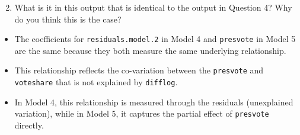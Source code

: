 \documentclass[12pt,letterpaper]{article}
\begin{document}
\noindent\begin{enumerate}[left=0pt]
\setcounter{enumi}{1}	
\item What is it in this output that is identical to the output in Question 4? Why do you think this is the case?
\end{enumerate}
\begin{itemize}
	\item The coefficients for \texttt{residuals.model.2} in Model 4 and \texttt{presvote} in Model 5 are the same because they both measure the same underlying relationship.
	\item This relationship reflects the co-variation between the \texttt{presvote} and \texttt{voteshare} that is not explained by \texttt{difflog}. 
	\item In Model 4, this relationship is measured through the residuals (unexplained variation), while in Model 5, it captures the partial effect of \texttt{presvote} directly.
\end{itemize}
\end{document}
